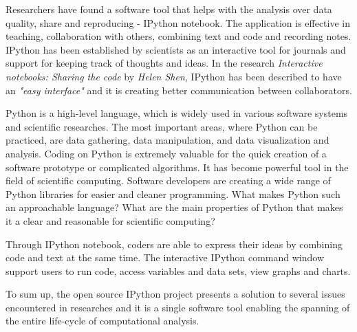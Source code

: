 

Researchers have found a software tool that helps with the analysis over data quality, share and reproducing - IPython notebook. The application is effective in teaching, collaboration with others, combining text and code and recording notes. IPython has been established by scientists as an interactive tool for journals and support for keeping track of thoughts and ideas. In the research \textit{Interactive notebooks: Sharing the code} by \textit{Helen Shen}, IPython has been described to have an \textit{"easy interface"} and it is creating better communication between collaborators.\cite{shen2014interactive}

Python is a high-level language, which is widely used in various software systems and scientific researches. The most important areas, where Python can be practiced, are data gathering, data manipulation, and data visualization and analysis. Coding on Python is extremely valuable for the quick creation of a software prototype or complicated algorithms. It has become powerful tool in the field of scientific computing. Software developers are creating a wide range of Python libraries for easier and cleaner programming.  What makes Python such an approachable language? What are the main properties of Python that makes it a clear and reasonable for scientific computing? 

Through IPython notebook, coders are able to express their ideas by combining code and text at the same time. The interactive IPython command window support users to run code, access variables and data sets, view graphs and charts.\cite{perez2013open}

To sum up, the open source IPython project presents a solution to several issues encountered in researches and it is a single software tool enabling the spanning of the entire life-cycle of computational analysis. 
